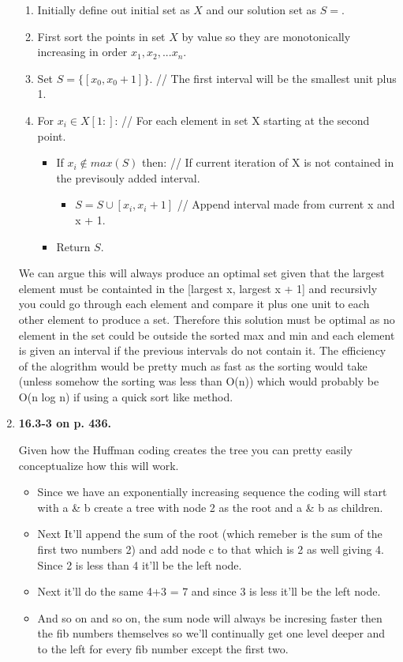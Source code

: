 \documentclass{article}
\begin{document}
\begin{enumerate}
    \begin{enumerate}
      \item Initially define out initial set as $X$ and our solution set as $S = {}$.
      \item First sort the points in set $X$ by value so they are monotonically increasing in order $x_1, x_2,...x_n$.
      \item Set $S = \{[x_0, x_0 + 1]\}$. // The first interval will be the smallest unit plus 1.
      \item For $x_i \in X[1:]$: // For each element in set X starting at the second point.
      \begin{itemize}
        \item If $x_i \notin max(S)$ then: // If current iteration of X is not contained in the previsouly added interval.
        \begin{itemize}          
          \item $S = S \cup [x_i, x_i + 1]$ // Append interval made from current x and x + 1.        
        \end{itemize}
        \item Return $S$.
      \end{itemize}
    \end{enumerate}

    We can argue this will always produce an optimal set given that the largest element must be containted in the [largest x, largest x + 1] and recursivly you could go through each element and compare it plus one unit to each other element to produce a set.
    Therefore this solution must be optimal as no element in the set could be outside the sorted max and min and each element is given an interval if the previous intervals do not contain it.
    The efficiency of the alogrithm would be pretty much as fast as the sorting would take (unless somehow the sorting was less than O(n)) which would probably be O(n log n) if using a quick sort like method.

    \item \textbf{16.3-3 on p. 436.}
    
    Given how the Huffman coding creates the tree you can pretty easily conceptualize how this will work. 
    \begin{itemize}
      \item Since we have an exponentially increasing sequence the coding will start with a \& b create a tree with node 2 as the root and a \& b as children.
      \item Next It'll append the sum of the root (which remeber is the sum of the first two numbers 2) and add node c to that which is 2 as well giving 4. Since 2 is less than 4 it'll be the left node.
      \item Next it'll do the same 4+3 = 7 and since 3 is less it'll be the left node.
      \item And so on and so on, the sum node will always be incresing faster then the fib numbers themselves so we'll continually get one level deeper and to the left for every fib number except the first two.      
    \end{itemize}


\end{enumerate}
\end{document}
